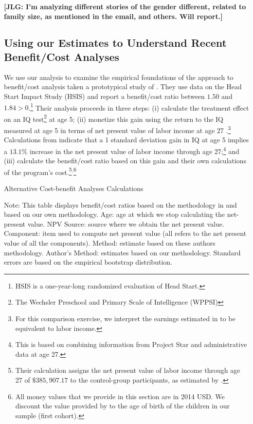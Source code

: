 \noindent \textbf{[JLG: I'm analyzing different stories of the gender different, related to family size, as mentioned in the email, and others. Will report.]}

\subsection{Using our Estimates to Understand Recent Benefit/Cost Analyses}

We use our analysis to examine the empirical foundations of the approach to benefit/cost analysis taken a prototypical study of \citet{Kline_Walters_2016_QJE}. They use data on the Head Start Impact Study (HSIS) and report a benefit/cost ratio between $1.50$ and $1.84 > 0$.\footnote{HSIS is a one-year-long randomized evaluation of Head Start.} Their analysis proceeds in three steps: (i) calculate the treatment effect on an IQ test\footnote{The Wechsler Preschool and Primary Scale of Intelligence (WPPSI)} at age 5; (ii) monetize this gain using the return to the IQ measured at age 5 in terms of net present value of labor income at age 27 \citep{Chetty_Friedman_etal_2011_QJoE}.\footnote{For this comparison exercise, we interpret the earnings estimated in \citet{Chetty_Friedman_etal_2011_QJoE} to be equivalent to labor income.} Calculations from \citet{Chetty_Friedman_etal_2011_QJoE} indicate that a 1 standard deviation gain in IQ at age 5 implies a $13.1\%$ increase in the net present value of labor income through age 27;\footnote{This is based on combining information from Project Star and administrative data at age 27.} and (iii) calculate the benefit/cost ratio based on this gain and their own calculations of the program's cost.\footnote{Their calculation assigns the net present value of labor income through age 27 of $\$385,907.17$ to the control-group participants, as estimated by  \citet{Chetty_Friedman_etal_2011_QJoE}.}$^,$\footnote{All money values that we provide in this section are in 2014 USD. We discount the value provided by \citet{Chetty_Friedman_etal_2011_QJoE} to the age of birth of the children in our sample (first cohort).}


\begin{table}[!htbp]
\begin{threeparttable}
\caption{Alternative Cost-benefit Analyses Calculations}
\label{table:comparing}
\centering
\footnotesize

\begin{tablenotes}
\footnotesize
\item Note: This table displays benefit/cost ratios based on the methodology in \citet{Kline_Walters_2016_QJE} and based on our own methodology. Age: age at which we stop calculating the net-present value. NPV Source: source where we obtain the net present value. Component: item used to compute net present value (all refers to the net present value of all the components). \citet{Kline_Walters_2016_QJE} Method: estimate based on these authors methodology. Author's Method: estimates based on our methodology. Standard errors are based on the empirical bootstrap distribution.
\end{tablenotes}
\end{threeparttable}
\end{table}

